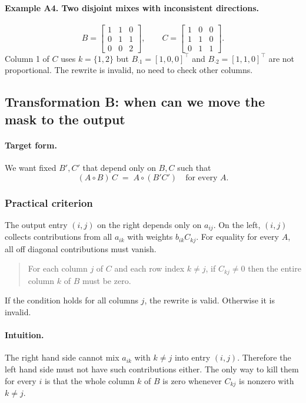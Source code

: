 \documentclass[11pt,a4paper]{article}
\theoremstyle{definition}
\newcommand{\Had}{\circ}
\begin{document}
\paragraph{Example A4. Two disjoint mixes with inconsistent directions.}
\[
B=\begin{bmatrix}
1&1&0\\
0&1&1\\
0&0&2
\end{bmatrix},
\qquad
C=\begin{bmatrix}
1&0&0\\
1&1&0\\
0&1&1
\end{bmatrix}.
\]
Column 1 of $C$ uses $k=\{1,2\}$ but $B_{\cdot 1}=[1,0,0]^\top$ and $B_{\cdot 2}=[1,1,0]^\top$ are not proportional. The rewrite is invalid, no need to check other columns.

\bigskip
\subsection{Transformation B: when can we move the mask to the output}
\label{subsec:dev-B}

\paragraph{Target form.}
We want fixed $B',C'$ that depend only on $B,C$ such that
\[
(A \Had B)\,C \;=\; A \Had (B' C') \quad \text{for every } A.
\]

\subsubsection*{Practical criterion}
The output entry $(i,j)$ on the right depends only on $a_{ij}$. On the left, $(i,j)$ collects contributions from all $a_{ik}$ with weights $b_{ik} C_{k j}$. For equality for every $A$, all off diagonal contributions must vanish.

\begin{quote}
For each column $j$ of $C$ and each row index $k\ne j$, if $C_{k j}\ne 0$ then the entire column $k$ of $B$ must be zero.
\end{quote}

If the condition holds for all columns $j$, the rewrite is valid. Otherwise it is invalid.

\paragraph{Intuition.}
The right hand side cannot mix $a_{ik}$ with $k\ne j$ into entry $(i,j)$. Therefore the left hand side must not have such contributions either. The only way to kill them for every $i$ is that the whole column $k$ of $B$ is zero whenever $C_{k j}$ is nonzero with $k\ne j$.
\end{document}
